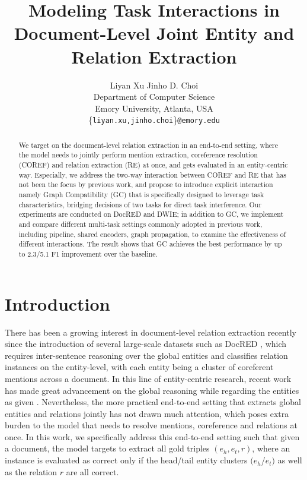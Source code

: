 \documentclass[11pt]{article}
\title{Modeling Task Interactions in\\ Document-Level Joint Entity and Relation Extraction}
\author{
  Liyan Xu \quad\quad Jinho D. Choi \\
  Department of Computer Science \\
  Emory University, Atlanta, USA \\ \{\texttt{liyan.xu,jinho.choi}\}\texttt{@emory.edu}}
\begin{document}
\maketitle

\begin{abstract}
We target on the document-level relation extraction in an end-to-end setting, where the model needs to jointly perform mention extraction, coreference resolution (COREF) and relation extraction (RE) at once, and gets evaluated in an entity-centric way. Especially, we address the two-way interaction between COREF and RE that has not been the focus by previous work, and propose to introduce explicit interaction namely Graph Compatibility (GC) that is specifically designed to leverage task characteristics, bridging decisions of two tasks for direct task interference.
Our experiments are conducted on DocRED and DWIE; in addition to GC, we implement and compare different multi-task settings commonly adopted in previous work, including pipeline, shared encoders, graph propagation, to examine the effectiveness of different interactions.
The result shows that GC achieves the best performance by up to 2.3/5.1 F1 improvement over the baseline.
\end{abstract} \section{Introduction}
\label{sec:intro}

There has been a growing interest in document-level relation extraction recently since the introduction of several large-scale datasets such as DocRED \citep{docred}, which requires inter-sentence reasoning over the global entities and classifies relation instances on the entity-level, with each entity being a cluster of coreferent mentions across a document.
In this line of entity-centric research, recent work has made great advancement on the global reasoning while regarding the entities as given \citep{nan-etal-2020-reasoning,atlop,ssan,learning-logic}.
Nevertheless, the more practical end-to-end setting that extracts global entities and relations jointly has not drawn much attention, which poses extra burden to the model that needs to resolve mentions, coreference and relations at once.
In this work, we specifically address this end-to-end setting such that given a document, the model targets to extract all gold triples $(e_h, e_t, r)$, where an instance is evaluated as correct only if the head/tail entity clusters $(e_h$/$e_t)$ as well as the relation $r$ are all correct.
\end{document}
